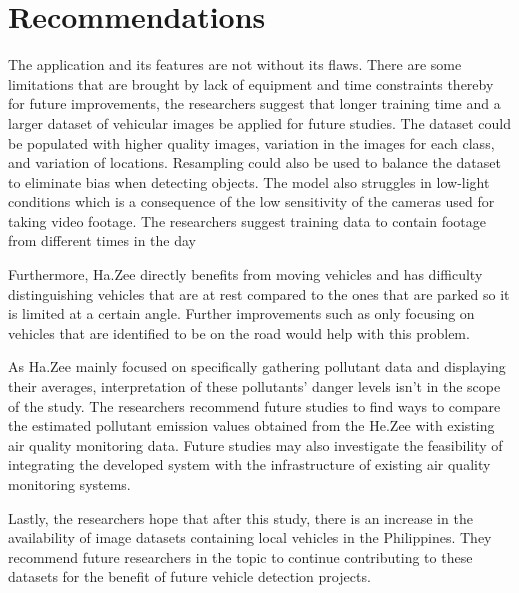 \section{Recommendations}

The application and its features are not without its flaws. There are some limitations that are brought by lack of equipment and time constraints thereby for future improvements, the researchers suggest that longer training time and a larger dataset of vehicular images be applied for future studies. The dataset could be populated with higher quality images, variation in the images for each class, and variation of locations. Resampling could also be used to balance the dataset to eliminate bias when detecting objects. The model also struggles in low-light conditions which is a consequence of the low sensitivity of the cameras used for taking video footage. The researchers suggest training data to contain footage from different times in the day

Furthermore, Ha.Zee directly benefits from moving vehicles and has difficulty distinguishing vehicles that are at rest compared to the ones that are parked so it is limited at a certain angle. Further improvements such as only focusing on vehicles that are identified to be on the road would help with this problem. 

As Ha.Zee mainly focused on specifically gathering pollutant data and displaying their averages, interpretation of these pollutants' danger levels isn't in the scope of the study. The researchers recommend future studies to find ways to compare the estimated pollutant emission values obtained from the He.Zee with existing air quality monitoring data. Future studies may also investigate the feasibility of integrating the developed system with the infrastructure of existing air quality monitoring systems.

Lastly, the researchers hope that after this study, there is an increase in the availability of image datasets containing local vehicles in the Philippines. They recommend future researchers in the topic to continue contributing to these datasets for the benefit of future vehicle detection projects.


